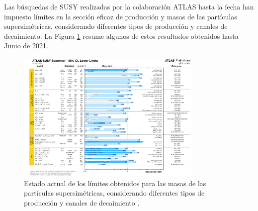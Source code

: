 Las búsquedas de SUSY realizadas por la colaboración ATLAS hasta la fecha han impuesto límites en la sección eficaz de producción y masas de las partículas supersimétricas, considerando diferentes tipos de producción y canales de decaimiento. La Figura \ref{fig:susy_xs_limits} resume algunos de estos resultados obtenidos hasta Junio de 2021.


\begin{figure}
	\centering
  \includegraphics[width=0.8\textwidth]{images/susy_xs_limits.pdf}
  \caption{Estado actual de los límites obtenidos para las masas de las partículas supersimétricas, considerando diferentes tipos de producción y canales de decaimiento \cite{susy_xs_limits}.}
  \label{fig:susy_xs_limits}
\end{figure}